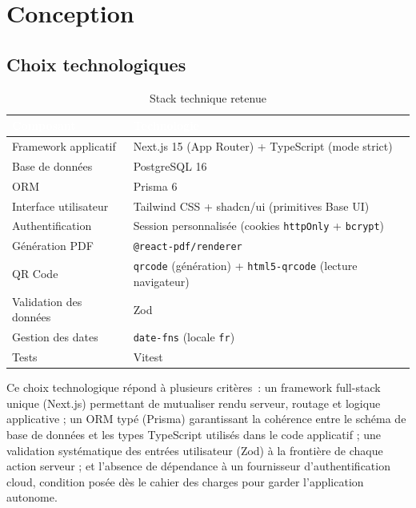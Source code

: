 \documentclass[11pt,a4paper]{report}
\begin{document}
\chapter{Conception}

\section{Choix technologiques}

\begin{table}[h!]
\centering
{}
\begin{tabularx}{\linewidth}{@{}l>{\raggedright\arraybackslash}X@{}}
\toprule
\rowcolor{km0blue}
\textcolor{white}{\textbf{Composant}} & \textcolor{white}{\textbf{Technologie}} \\
\midrule
Framework applicatif & Next.js 15 (App Router) + TypeScript (mode strict) \\
Base de données & PostgreSQL 16 \\
ORM & Prisma 6 \\
Interface utilisateur & Tailwind CSS + shadcn/ui (primitives Base UI) \\
Authentification & Session personnalisée (cookies \texttt{httpOnly} + \texttt{bcrypt}) \\
Génération PDF & \texttt{@react-pdf/renderer} \\
QR Code & \texttt{qrcode} (génération) + \texttt{html5-qrcode} (lecture navigateur) \\
Validation des données & Zod \\
Gestion des dates & \texttt{date-fns} (locale \texttt{fr}) \\
Tests & Vitest \\
\bottomrule
\end{tabularx}
\caption{Stack technique retenue}
\end{table}

Ce choix technologique répond à plusieurs critères~: un framework full-stack unique
(Next.js) permettant de mutualiser rendu serveur, routage et logique applicative ; un ORM
typé (Prisma) garantissant la cohérence entre le schéma de base de données et les types
TypeScript utilisés dans le code applicatif ; une validation systématique des entrées
utilisateur (Zod) à la frontière de chaque action serveur ; et l'absence de dépendance à
un fournisseur d'authentification cloud, condition posée dès le cahier des charges pour
garder l'application autonome.
\end{document}
